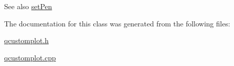 \begin{DoxySeeAlso}{See also}
\hyperlink{classQCPItemBracket_ab13001d9cc5d8f9e56ea15bdda682acb}{set\+Pen} 
\end{DoxySeeAlso}


The documentation for this class was generated from the following files\+:\begin{DoxyCompactItemize}
\item 
\hyperlink{qcustomplot_8h}{qcustomplot.\+h}\item 
\hyperlink{qcustomplot_8cpp}{qcustomplot.\+cpp}\end{DoxyCompactItemize}
